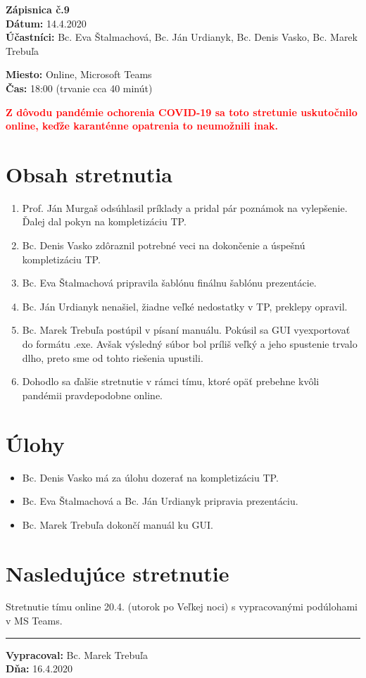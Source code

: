 
\usepackage{parskip}%
\usepackage[dvipsnames]{xcolor}

	\textbf{{\Huge Zápisnica č.9}}\\
			
	\textbf{Dátum:} 14.4.2020\\	
		
	\textbf{Účastníci:} Bc. Eva Štalmachová, Bc. Ján Urdianyk, Bc. Denis Vasko, Bc. Marek Trebuľa

	\textbf{Miesto:} Online, Microsoft Teams\\	
	
	\textbf{Čas:} 18:00 (trvanie cca 40 minút)
	
	\textbf{\textcolor{red}{Z dôvodu pandémie ochorenia COVID-19 sa toto stretunie uskutočnilo online, keďže karanténne opatrenia to neumožnili inak.}}   
    \section*{Obsah stretnutia}
    \begin{enumerate}
    	\item Prof. Ján Murgaš odsúhlasil príklady a pridal pár poznámok na vylepšenie. Ďalej dal pokyn na kompletizáciu TP.
    	\item Bc. Denis Vasko zdôraznil potrebné veci na dokončenie a úspešnú kompletizáciu TP. 
    	\item Bc. Eva Štalmachová pripravila šablónu finálnu šablónu prezentácie.
    	\item Bc. Ján Urdianyk nenašiel, žiadne veľké nedostatky v TP, preklepy opravil.
    	\item Bc. Marek Trebuľa postúpil v písaní manuálu. Pokúsil sa GUI vyexportovať do formátu .exe. Avšak výsledný súbor bol príliš veľký a jeho spustenie trvalo dlho, preto sme od tohto riešenia upustili.
    	\item Dohodlo sa ďalšie stretnutie v rámci tímu, ktoré opäť prebehne kvôli pandémii pravdepodobne online.
    \end{enumerate}    
    \section*{Úlohy}
    \begin{itemize}
    	\item Bc. Denis Vasko má za úlohu dozerať na kompletizáciu TP.
    	\item Bc. Eva Štalmachová a Bc. Ján Urdianyk pripravia prezentáciu.
    	\item Bc. Marek Trebuľa dokončí manuál ku GUI. 
    \end{itemize}

    \section*{Nasledujúce stretnutie}
    
    Stretnutie tímu online 20.4. (utorok po Veľkej noci) s vypracovanými podúlohami v MS Teams.

    
    \noindent\rule{15cm}{0.4pt}
   {\small 	\textbf{Vypracoval:} Bc. Marek Trebuľa\\
   \textbf{Dňa:} 16.4.2020 }
    

